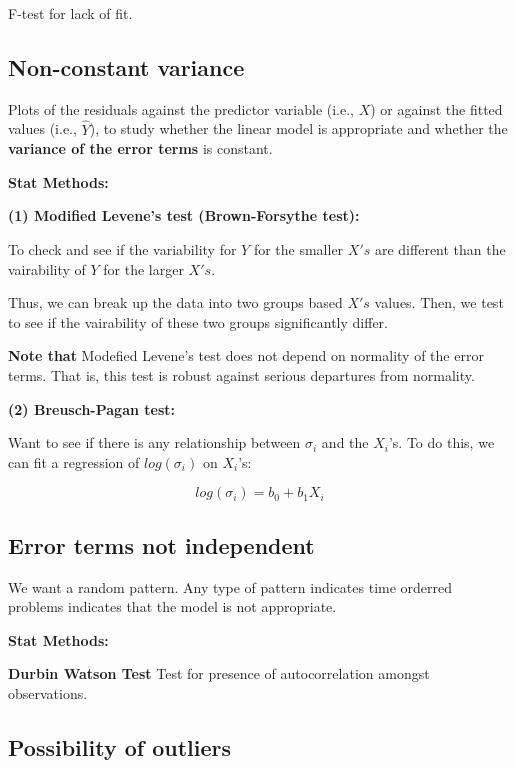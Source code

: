 \documentclass[]{book}
\begin{document}
F-test for lack of fit.

\hypertarget{non-constant-variance}{%
\subsection{Non-constant variance}\label{non-constant-variance}}

Plots of the residuals against the predictor variable (i.e., \(X\)) or against the fitted values (i.e., \(\hat{Y}\)), to study whether the linear model is appropriate and whether the \textbf{variance of the error terms} is constant.

\textbf{Stat Methods:}

\textbf{(1) Modified Levene's test (Brown-Forsythe test):}

To check and see if the variability for \(Y\) for the smaller \(X's\) are different than the vairability of \(Y\) for the larger \(X's\).

Thus, we can break up the data into two groups based \(X's\) values. Then, we test to see if the vairability of these two groups significantly differ.

\textbf{Note that} Modefied Levene's test does not depend on normality of the error terms. That is, this test is robust against serious departures from normality.

\textbf{(2) Breusch-Pagan test:}

Want to see if there is any relationship between \(\sigma_i\) and the \(X_i\)'s. To do this, we can fit a regression of \(log(\sigma_i)\) on \(X_i\)'s:

\[log(\sigma_i)=b_0+b_1X_i\]

\hypertarget{error-terms-not-independent}{%
\subsection{Error terms not independent}\label{error-terms-not-independent}}

We want a random pattern. Any type of pattern indicates time orderred problems indicates that the model is not appropriate.

\textbf{Stat Methods:}

\textbf{Durbin Watson Test} Test for presence of autocorrelation amongst observations.

\hypertarget{possibility-of-outliers}{%
\subsection{Possibility of outliers}\label{possibility-of-outliers}}
\end{document}
